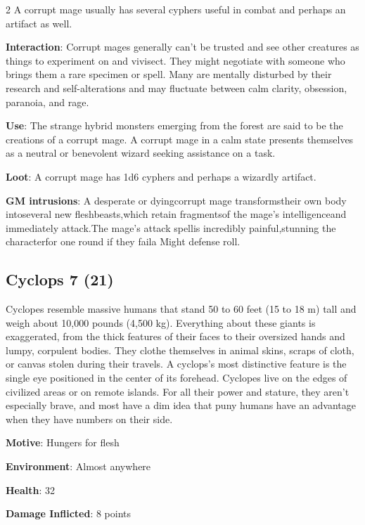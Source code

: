 \begin{multicols}{2}
A corrupt mage usually has several cyphers useful in combat and perhaps an artifact as well. 

\textbf{Interaction}: Corrupt mages generally can’t be trusted and see other creatures as things to experiment on and vivisect. They might negotiate with someone who brings them a rare specimen or spell. Many are mentally disturbed by their research and self-alterations and may fluctuate between calm clarity, obsession, paranoia, and rage. 

\textbf{Use}: The strange hybrid monsters emerging from the forest are said to be the creations of a corrupt mage. A corrupt mage in a calm state presents themselves as a neutral or benevolent wizard seeking assistance on a task. 

\textbf{Loot}: A corrupt mage has 1d6 cyphers and perhaps a wizardly artifact.

\textbf{GM intrusions}: A desperate or dyingcorrupt mage transformstheir own body intoseveral new fleshbeasts,which retain fragmentsof the mage’s intelligenceand immediately attack.The mage’s attack spellis incredibly painful,stunning the characterfor one round if they faila Might defense roll.

\subsection{Cyclops 7 (21)}

Cyclopes resemble massive humans that stand 50 to 60 feet (15 to 18 m) tall and weigh about 10,000 pounds (4,500 kg). Everything about these giants is exaggerated, from the thick features of their faces to their oversized hands and lumpy, corpulent bodies. They clothe themselves in animal skins, scraps of cloth, or canvas stolen during their travels. A cyclops’s most distinctive feature is the single eye positioned in the center of its forehead. Cyclopes live on the edges of civilized areas or on remote islands. For all their power and stature, they aren’t especially brave, and most have a dim idea that puny humans have an advantage when they have numbers on their side.

\textbf{Motive}: Hungers for flesh 

\textbf{Environment}: Almost anywhere 

\textbf{Health}: 32

\textbf{Damage Inflicted}: 8 points 


\end{multicols}
